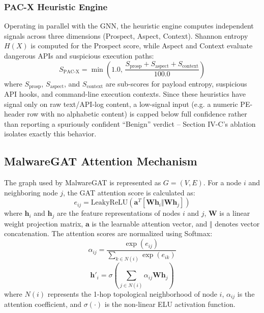 \documentclass[conference]{IEEEtran}
\begin{document}
\subsubsection{PAC-X Heuristic Engine}
Operating in parallel with the GNN, the heuristic engine computes independent signals across three dimensions (Prospect, Aspect, Context). Shannon entropy $H(X)$ is computed for the Prospect score, while Aspect and Context evaluate dangerous APIs and suspicious execution paths:
\begin{equation}
\label{eq:pacx}
S_{\text{PAC-X}} = \min\left(1.0, \, \frac{S_{\text{prosp}} + S_{\text{aspect}} + S_{\text{context}}}{100.0}\right)
\end{equation}
where $S_{\text{prosp}}$, $S_{\text{aspect}}$, and $S_{\text{context}}$ are sub-scores for payload entropy, suspicious API hooks, and command-line execution contexts. Since these heuristics have signal only on raw text/API-log content, a low-signal input (e.g. a numeric PE-header row with no alphabetic content) is capped below full confidence rather than reporting a spuriously confident ``Benign'' verdict -- Section IV-C's ablation isolates exactly this behavior.

\subsection{MalwareGAT Attention Mechanism}
The graph used by MalwareGAT is represented as $G=(V,E)$. For a node $i$ and neighboring node $j$, the GAT attention score is calculated as:
\begin{equation}
\label{eq:attn}
e_{ij} = \mathrm{LeakyReLU} \left( \mathbf{a}^{T} [ \mathbf{W}\mathbf{h}_i \Vert \mathbf{W}\mathbf{h}_j ] \right)
\end{equation}
where $\mathbf{h}_i$ and $\mathbf{h}_j$ are the feature representations of nodes $i$ and $j$, $\mathbf{W}$ is a linear weight projection matrix, $\mathbf{a}$ is the learnable attention vector, and $\Vert$ denotes vector concatenation. The attention scores are normalized using Softmax:
\begin{equation}
\label{eq:softmax}
\alpha_{ij} = \frac{\exp(e_{ij})}{\sum_{k \in N(i)} \exp(e_{ik})}
\end{equation}
\begin{equation}
\label{eq:gatupdate}
\mathbf{h}'_i = \sigma \left( \sum_{j \in N(i)} \alpha_{ij}\mathbf{W}\mathbf{h}_j \right)
\end{equation}
where $N(i)$ represents the 1-hop topological neighborhood of node $i$, $\alpha_{ij}$ is the attention coefficient, and $\sigma(\cdot)$ is the non-linear ELU activation function.
\end{document}
